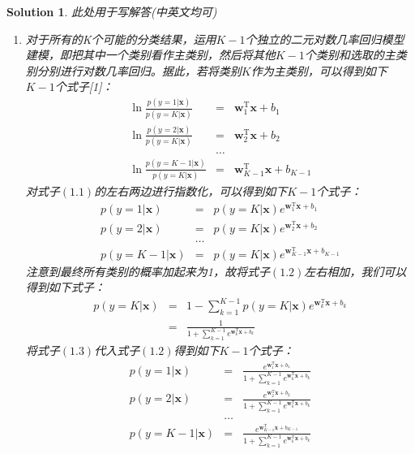 \documentclass[a4paper,UTF8]{article}
\numberwithin{equation}{section}
\newtheorem*{solution}{Solution}
\begin{document}
\begin{solution}
此处用于写解答(中英文均可)
\begin{enumerate}
	\item 对于所有的K个可能的分类结果，运用$K-1$个独立的二元对数几率回归模型建模，即把其中一个类别看作主类别，然后将其他$K-1$个类别和选取的主类别分别进行对数几率回归。据此，若将类别$K$作为主类别，可以得到如下$K-1$个式子[1]：
		\begin{eqnarray}
			\ln\frac{p(y=1|\mathbf{x})}{p(y=K|\mathbf{x})}&=&\mathbf{w}_1^\mathrm{T}\mathbf{x}+b_1\\
			\ln\frac{p(y=2|\mathbf{x})}{p(y=K|\mathbf{x})}&=&\mathbf{w}_2^\mathrm{T}\mathbf{x}+b_2 \nonumber\\
			&\dots& \nonumber\\
			\ln\frac{p(y={K-1}|\mathbf{x})}{p(y=K|\mathbf{x})}&=&\mathbf{w}_{K-1}^\mathrm{T}\mathbf{x}+b_{K-1} \nonumber
		\end{eqnarray}
		对式子$(1.1)$的左右两边进行指数化，可以得到如下$K-1$个式子：
		\begin{eqnarray}
			p(y=1|\mathbf{x})&=&p(y=K|\mathbf{x})e^{\mathbf{w}_1^\mathrm{T}\mathbf{x}+b_1}\\
			p(y=2|\mathbf{x})&=&p(y=K|\mathbf{x})e^{\mathbf{w}_2^\mathrm{T}\mathbf{x}+b_2} \nonumber\\
			&\dots& \nonumber\\
			p(y={K-1}|\mathbf{x})&=&p(y=K|\mathbf{x})e^{\mathbf{w}_{K-1}^\mathrm{T}\mathbf{x}+b_{K-1}} \nonumber
		\end{eqnarray}
		注意到最终所有类别的概率加起来为1，故将式子$(1.2)$左右相加，我们可以得到如下式子：
		\begin{eqnarray}
			p(y=K|\mathbf{x})&=&1-\sum_{k=1}^{K-1}p(y=K|\mathbf{x})e^{\mathbf{w}_k^\mathrm{T}\mathbf{x}+b_k}\\
			&=&\frac{1}{1+\sum_{k=1}^{K-1} e^{\mathbf{w}_k^\mathrm{T}\mathbf{x}+b_k}}\nonumber
		\end{eqnarray}
		将式子$(1.3)$代入式子$(1.2)$得到如下$K-1$个式子：
		\begin{eqnarray}
			p(y=1|\mathbf{x})&=&\frac{e^{\mathbf{w}_1^\mathrm{T}\mathbf{x}+b_1}}{1+\sum_{k=1}^{K-1} e^{\mathbf{w}_k^\mathrm{T}\mathbf{x}+b_k}}\\
			p(y=2|\mathbf{x})&=&\frac{e^{\mathbf{w}_2^\mathrm{T}\mathbf{x}+b_2}}{1+\sum_{k=1}^{K-1} e^{\mathbf{w}_k^\mathrm{T}\mathbf{x}+b_k}} \nonumber\\
			&\dots& \nonumber\\
			p(y={K-1}|\mathbf{x})&=&\frac{e^{\mathbf{w}_{K-1}^\mathrm{T}\mathbf{x}+b_{K-1}}}{1+\sum_{k=1}^{K-1} e^{\mathbf{w}_k^\mathrm{T}\mathbf{x}+b_k}} \nonumber

\end{eqnarray}
\end{enumerate}
\end{solution}
\end{document}
